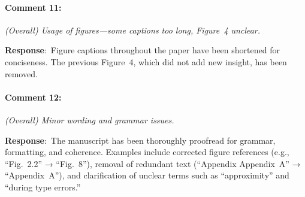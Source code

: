 \documentclass{article}
\newcommand{\pointRaised}[2]{\medskip \noindent 
               \paragraph{#1} \textsl{#2}}
\newcommand{\reply}{\noindent \textbf{Response}:\ }
\begin{document}
\pointRaised{Comment 11:}{(Overall) Usage of figures—some captions too long, Figure~4 unclear.}

\reply Figure captions throughout the paper have been shortened for conciseness. The previous Figure~4, which did not add new insight, has been removed.

\pointRaised{Comment 12:}{(Overall) Minor wording and grammar issues.}

\reply The manuscript has been thoroughly proofread for grammar, formatting, and coherence.  
Examples include corrected figure references (e.g., “Fig.~2.2” → “Fig.~8”), removal of redundant text (“Appendix Appendix~A” → “Appendix~A”), and clarification of unclear terms such as “approximity” and “during type errors.”
\end{document}
